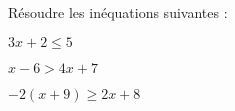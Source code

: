 \documentclass{automatisme}
\begin{document}
\begin{frame}
	Résoudre les inéquations suivantes :

	\newcommand{\MySpacing}{10em}
	\begin{minipage}{0.3\textwidth}
		$3x + 2 ≤ 5$
		\vspace{\MySpacing}
	\end{minipage}\hfill\vline\hfill
	\begin{minipage}{0.3\textwidth}
		$x - 6 > 4x + 7$
		\vspace{\MySpacing}
	\end{minipage}\hfill\vline\hfill
	\begin{minipage}{0.3\textwidth}
		$-2(x + 9) ≥ 2x + 8$
		\vspace{\MySpacing}
	\end{minipage}
\end{frame}
\end{document}
